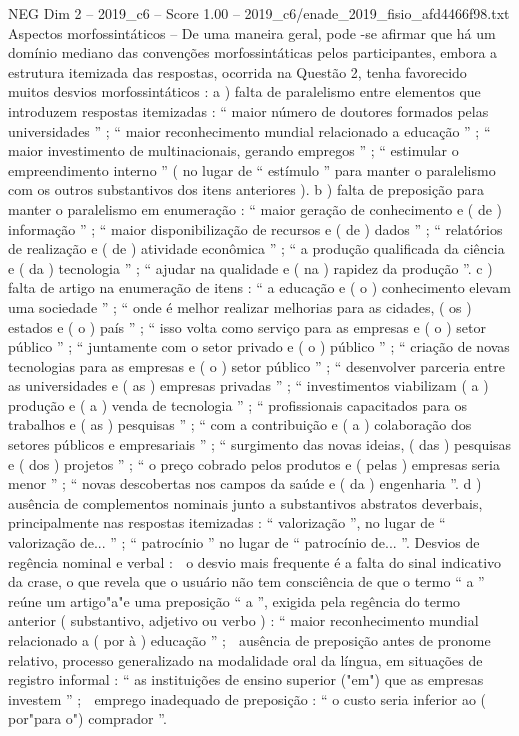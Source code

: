 \begin{textsample}{NEG Dim 2 – 2019\_c6 – Score 1.00 – 2019\_c6/enade\_2019\_fisio\_afd4466f98.txt}
Aspectos morfossintáticos – De uma maneira geral, pode -se afirmar que há um domínio mediano das convenções morfossintáticas pelos participantes, embora a estrutura itemizada das respostas, ocorrida na Questão 2, tenha favorecido muitos desvios morfossintáticos : a ) falta de paralelismo entre elementos que introduzem respostas itemizadas : “ maior número de doutores formados pelas universidades ” ; “ maior reconhecimento mundial relacionado a educação ” ; “ maior investimento de multinacionais, gerando empregos ” ; “ estimular o empreendimento interno ” ( no lugar de “ estímulo ” para manter o paralelismo com os outros substantivos dos itens anteriores ). b ) falta de preposição para manter o paralelismo em enumeração : “ maior geração de conhecimento e ( de ) informação ” ; “ maior disponibilização de recursos e ( de ) dados ” ; “ relatórios de realização e ( de ) atividade econômica ” ; “ a produção qualificada da ciência e ( da ) tecnologia ” ; “ ajudar na qualidade e ( na ) rapidez da produção ”. c ) falta de artigo na enumeração de itens : “ a educação e ( o ) conhecimento elevam uma sociedade ” ; “ onde é melhor realizar melhorias para as cidades, ( os ) estados e ( o ) país ” ; “ isso volta como serviço para as empresas e ( o ) setor público ” ; “ juntamente com o setor privado e ( o ) público ” ; “ criação de novas tecnologias para as empresas e ( o ) setor público ” ; “ desenvolver parceria entre as universidades e ( as ) empresas privadas ” ; “ investimentos viabilizam ( a ) produção e ( a ) venda de tecnologia ” ; “ profissionais capacitados para os trabalhos e ( as ) pesquisas ” ; “ com a contribuição e ( a ) colaboração dos setores públicos e empresariais ” ; “ surgimento das novas ideias, ( das ) pesquisas e ( dos ) projetos ” ; “ o preço cobrado pelos produtos e ( pelas ) empresas seria menor ” ; “ novas descobertas nos campos da saúde e ( da ) engenharia ”. d ) ausência de complementos nominais junto a substantivos abstratos deverbais, principalmente nas respostas itemizadas : “ valorização ”, no lugar de “ valorização de... ” ; “ patrocínio ” no lugar de “ patrocínio de... ”.
Desvios de regência nominal e verbal :  o desvio mais frequente é a falta do sinal indicativo da crase, o que revela que o usuário não tem consciência de que o termo “ a ” reúne um artigo"a"e uma preposição “ a ”, exigida pela regência do termo anterior ( substantivo, adjetivo ou verbo ) : “ maior reconhecimento mundial relacionado a ( por à ) educação ” ;  ausência de preposição antes de pronome relativo, processo generalizado na modalidade oral da língua, em situações de registro informal : “ as instituições de ensino superior ("em") que as empresas investem ” ;  emprego inadequado de preposição : “ o custo seria inferior ao ( por"para o") comprador ”.

\end{textsample}
